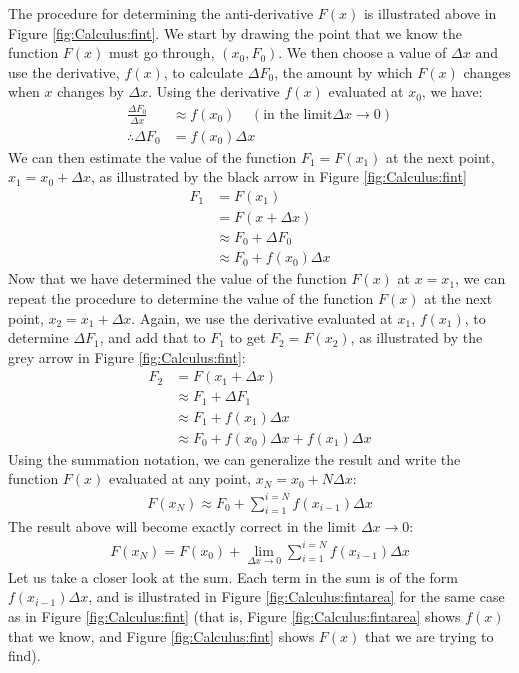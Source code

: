 The procedure for determining the anti-derivative $F(x)$ is illustrated above in Figure \ref{fig:Calculus:fint}. We start by drawing the point that we know the function $F(x)$ must go through, $(x_0,F_0)$. We then choose a value of $\Delta x$ and use the derivative, $f(x)$, to calculate $\Delta F_0$, the amount by which $F(x)$ changes when $x$ changes by $\Delta x$. Using the derivative $f(x)$ evaluated at $x_0$, we have:
\begin{align*}
\frac{\Delta F_0}{\Delta x} &\approx f(x_0)\;\;\;\; (\text{in the limit} \Delta x\to 0 )\\
\therefore \Delta F_0 &= f(x_0) \Delta x
\end{align*}
We can then estimate the value of the function $F_1=F(x_1)$ at the next point, $x_1=x_0+\Delta x$, as illustrated by the black arrow in Figure \ref{fig:Calculus:fint} 
\begin{align*}
F_1&=F(x_1)\\
&=F(x+\Delta x) \\
&\approx F_0 + \Delta F_0\\
&\approx F_0+f(x_0)\Delta x
\end{align*}
Now that we have determined the value of the function $F(x)$ at $x=x_1$, we can repeat the procedure to determine the value of the function $F(x)$ at the next point, $x_2=x_1+\Delta x$. Again, we use the derivative evaluated at $x_1$, $f(x_1)$, to determine $\Delta F_1$, and add that to $F_1$ to get $F_2=F(x_2)$, as illustrated by the grey arrow in Figure \ref{fig:Calculus:fint}:
\begin{align*}
F_2&=F(x_1+\Delta x) \\
&\approx F_1+\Delta F_1\\
&\approx F_1+f(x_1)\Delta x\\
&\approx F_0+f(x_0)\Delta x+f(x_1)\Delta x
\end{align*}
Using the summation notation, we can generalize the result and write the function $F(x)$ evaluated at any point, $x_N=x_0+N\Delta x$:
\begin{align*}
F(x_N) \approx F_0+\sum_{i=1}^{i=N} f(x_{i-1}) \Delta x
\end{align*}
The result above will become exactly correct in the limit $\Delta x\to 0$:
\begin{align}
\label{eqn:Calculus:intsum}
F(x_N) = F(x_0)+\lim_{\Delta x\to 0}\sum_{i=1}^{i=N} f(x_{i-1}) \Delta x
\end{align}
Let us take a closer look at the sum. Each term in the sum is of the form $f(x_{i-1})\Delta x$, and is illustrated in Figure \ref{fig:Calculus:fintarea} for the same case as in Figure \ref{fig:Calculus:fint} (that is, Figure \ref{fig:Calculus:fintarea} shows $f(x)$ that we know, and Figure \ref{fig:Calculus:fint} shows $F(x)$ that we are trying to find).

